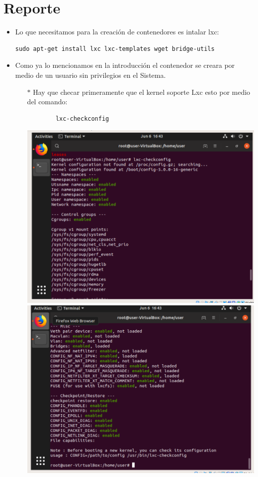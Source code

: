 \documentclass[a4paper, 11pt, oneside]{article}
\begin{document}
\section*{Reporte}
\begin{itemize}
    \item Lo que necesitamos para la creación de contenedores es intalar lxc:
    \begin{verbatim}
sudo apt-get install lxc lxc-templates wget bridge-utils
    \end{verbatim}
    \item Como ya lo mencionamos en la introducción el contenedor se creara por medio de un usuario sin privilegios en el Sistema.
    \begin{itemize}
        \item[$\ast$] Hay que checar primeramente que el kernel soporte Lxc esto por medio del comando:
    \begin{verbatim}
        lxc-checkconfig
    \end{verbatim}
    \begin{center}
        \includegraphics[scale=0.30]{P91.png}\\
        \includegraphics[scale=0.30]{P92.png}

\end{center}
\end{itemize}
\end{itemize}
\end{document}
